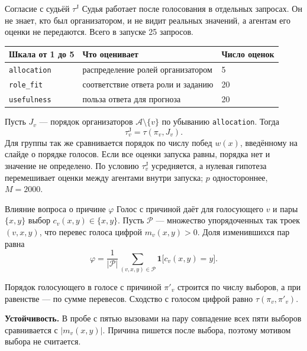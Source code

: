 \documentclass[aspectratio=169,11pt]{beamer}
\newcommand{\ind}{\mathbf 1}
\begin{document}
\begin{frame}{Согласие с судьёй $\tau^{\mathrm J}$}
\small Судья работает после голосования в отдельных запросах. Он не знает, кто был организатором, и не видит реальных значений, а агентам его оценки не передаются. Всего в запуске 25 запросов.

\medskip
\begin{tabular}{@{}lll@{}}
\toprule
Шкала от 1 до 5 & Что оценивает & Число оценок\\
\midrule
\texttt{allocation} & распределение ролей организатором & 5\\
\texttt{role\_fit} & соответствие ответа роли и заданию & 20\\
\texttt{usefulness} & польза ответа для прогноза & 20\\
\bottomrule
\end{tabular}

\bigskip
Пусть $J_v$ --- порядок организаторов $\mathcal A\setminus\{v\}$ по убыванию \texttt{allocation}. Тогда
\[\tau^{\mathrm J}_v=\tau(\pi_v,J_v).\]
Для группы так же сравнивается порядок по числу побед $w(x)$, введённому на слайде о порядке голосов. Если все оценки запуска равны, порядка нет и значение не определено. По условию $\tau^{\mathrm J}_v$ усредняется, а нулевая гипотеза перемешивает оценки между агентами внутри запуска; $p$ одностороннее, $M=2000$.
\end{frame}

\begin{frame}{Влияние вопроса о причине $\varphi$}
\small Голос с причиной даёт для голосующего $v$ и пары $\{x,y\}$ выбор $c_v(x,y)\in\{x,y\}$. Пусть $\mathcal P$ --- множество упорядоченных так троек $(v,x,y)$, что перевес голоса цифрой $m_v(x,y)>0$. Доля изменившихся пар равна
\[\varphi=\frac{1}{\lvert\mathcal P\rvert}\sum_{(v,x,y)\in\mathcal P}\ind\bigl[c_v(x,y)=y\bigr].\]

Порядок голосующего в голосе с причиной $\pi'_v$ строится по числу выборов, а при равенстве --- по сумме перевесов. Сходство с голосом цифрой равно $\tau(\pi_v,\pi'_v)$.

\medskip
\textbf{Устойчивость.} В пробе с пятью вызовами на пару совпадение всех пяти выборов сравнивается с $\lvert m_v(x,y)\rvert$. Причина пишется после выбора, поэтому мотивом выбора не считается.
\end{frame}
\end{document}
